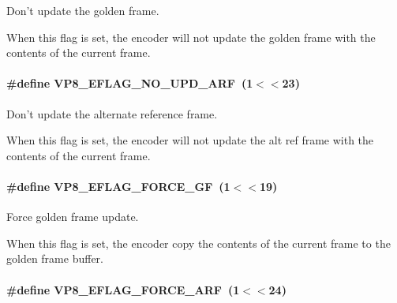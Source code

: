 Don't update the golden frame. 

When this flag is set, the encoder will not update the golden frame with the contents of the current frame. \hypertarget{group__vp8__encoder_ga1cff46a5287e73a620660030d40b9e6c}{
\paragraph[{V\-P8\-\_\-\-E\-F\-L\-A\-G\-\_\-\-N\-O\-\_\-\-U\-P\-D\-\_\-\-A\-R\-F}]{\setlength{\rightskip}{0pt plus 5cm}\#define V\-P8\-\_\-\-E\-F\-L\-A\-G\-\_\-\-N\-O\-\_\-\-U\-P\-D\-\_\-\-A\-R\-F~(1$<$$<$23)}}\label{group__vp8__encoder_ga1cff46a5287e73a620660030d40b9e6c}


Don't update the alternate reference frame. 

When this flag is set, the encoder will not update the alt ref frame with the contents of the current frame. \hypertarget{group__vp8__encoder_gacb64c00adcb361f72a9a3028eb12f5ff}{
\paragraph[{V\-P8\-\_\-\-E\-F\-L\-A\-G\-\_\-\-F\-O\-R\-C\-E\-\_\-\-G\-F}]{\setlength{\rightskip}{0pt plus 5cm}\#define V\-P8\-\_\-\-E\-F\-L\-A\-G\-\_\-\-F\-O\-R\-C\-E\-\_\-\-G\-F~(1$<$$<$19)}}\label{group__vp8__encoder_gacb64c00adcb361f72a9a3028eb12f5ff}


Force golden frame update. 

When this flag is set, the encoder copy the contents of the current frame to the golden frame buffer. \hypertarget{group__vp8__encoder_ga50584fe4bdb62ff935347576539650b7}{
\paragraph[{V\-P8\-\_\-\-E\-F\-L\-A\-G\-\_\-\-F\-O\-R\-C\-E\-\_\-\-A\-R\-F}]{\setlength{\rightskip}{0pt plus 5cm}\#define V\-P8\-\_\-\-E\-F\-L\-A\-G\-\_\-\-F\-O\-R\-C\-E\-\_\-\-A\-R\-F~(1$<$$<$24)}}\label{group__vp8__encoder_ga50584fe4bdb62ff935347576539650b7}


